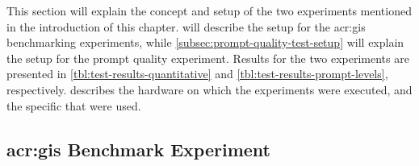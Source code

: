 
This section will explain the concept and setup of the two experiments mentioned in the introduction of this chapter.  will describe the setup for the \acrshort{acr:gis} benchmarking experiments, while \autoref{subsec:prompt-quality-test-setup} will explain the setup for the prompt quality experiment. Results for the two experiments are presented in \autoref{tbl:test-results-quantitative} and \autoref{tbl:test-results-prompt-levels}, respectively.  describes the hardware on which the experiments were executed, and the specific  that were used.

\subsection[GIS Benchmark Experiment]{\acrshort{acr:gis} Benchmark Experiment}
\label{subsec:benchmarking-setup}


